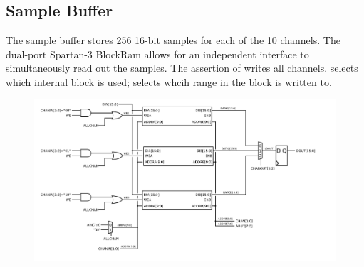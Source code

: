
\subsection{Sample Buffer}

The sample buffer stores 256 16-bit samples for each of the 10
channels. The dual-port Spartan-3 BlockRam allows for an independent
interface to simultaneously read out the samples. The assertion of
 writes all channels.  selects which
internal block is used;  selects whcih range in the
block is written to.

\begin{figure}
\begin{centering}
\includegraphics[scale=0.7]{samplebuffer.svg}
\end{centering}
\end{figure}
